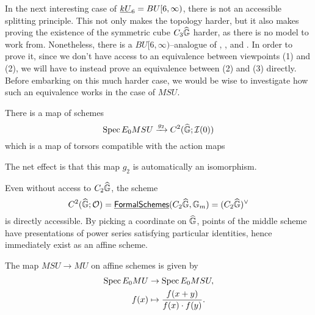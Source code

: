 In the next interesting case of $\underline{\smash{kU}}_{6} = BU[6, \infty)$, there is not an accessible splitting principle.  This not only makes the topology harder, but it also makes proving the existence of the symmetric cube $C_3 \widehat{\mathbb G}$ harder, as there is no model to work from.  Nonetheless, there is a $BU[6, \infty)$--analogue of , , and .  In order to prove it, since we don't have access to an equivalence between viewpoints (1) and (2), we will have to instead prove an equivalence between (2) and (3) directly.  Before embarking on this much harder case, we would be wise to investigate how such an equivalence works in the case of $MSU$.


There is a map of schemes \[\operatorname{Spec} E_0 MSU \xrightarrow{g_2} C^2(\widehat{\mathbb G}; \mathcal{I}(0))\] which is a map of torsors compatible with the action maps
\begin{center}
\end{center}
The net effect is that this map $g_2$ is automatically an isomorphism.


\begin{remark}
Even without access to $C_2 \widehat{\mathbb G}$, the scheme \[C^2(\widehat{\mathbb G}; \mathcal{O}) = \operatorname{\underline{\smash{\mathsf{FormalSchemes}}}}(C_2 \widehat{\mathbb G}, \mathbb G_m) = (C_2 \widehat{\mathbb G})^\vee\] is directly accessible.  By picking a coordinate on $\widehat{\mathbb G}$, points of the middle scheme have presentations of power series satisfying particular identities, hence immediately exist as an affine scheme.
\end{remark}

\begin{remark}
The map $MSU \to MU$ on affine schemes is given by
\begin{align*}
\operatorname{Spec} E_0 MU & \to \operatorname{Spec} E_0 MSU, \\
f(x) & \mapsto \frac{f(x + y)}{f(x) \cdot f(y)}.
\end{align*}
\end{remark}














